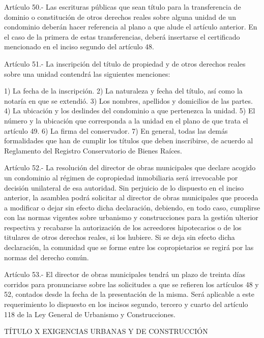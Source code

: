     Artículo 50.- Las escrituras públicas que sean título para la transferencia de dominio o constitución de otros derechos reales sobre alguna unidad de un condominio deberán hacer referencia al plano a que alude el artículo anterior. En el caso de la primera de estas transferencias, deberá insertarse el certificado mencionado en el inciso segundo del artículo 48.
     
    Artículo 51.- La inscripción del título de propiedad y de otros derechos reales sobre una unidad contendrá las siguientes menciones:
     
    1) La fecha de la inscripción.
    2) La naturaleza y fecha del título, así como la notaría en que se extendió.
    3) Los nombres, apellidos y domicilios de las partes.
    4) La ubicación y los deslindes del condominio a que pertenezca la unidad.
    5) El número y la ubicación que corresponda a la unidad en el plano de que trata el artículo 49.
    6) La firma del conservador.
    7) En general, todas las demás formalidades que han de cumplir los títulos que deben inscribirse, de acuerdo al Reglamento del Registro Conservatorio de Bienes Raíces.
     
    Artículo 52.- La resolución del director de obras municipales que declare acogido un condominio al régimen de copropiedad inmobiliaria será irrevocable por decisión unilateral de esa autoridad.
    Sin perjuicio de lo dispuesto en el inciso anterior, la asamblea podrá solicitar al director de obras municipales que proceda a modificar o dejar sin efecto dicha declaración, debiendo, en todo caso, cumplirse con las normas vigentes sobre urbanismo y construcciones para la gestión ulterior respectiva y recabarse la autorización de los acreedores hipotecarios o de los titulares de otros derechos reales, si los hubiere. Si se deja sin efecto dicha declaración, la comunidad que se forme entre los copropietarios se regirá por las normas del derecho común.
   
    Artículo 53.- El director de obras municipales tendrá un plazo de treinta días corridos para pronunciarse sobre las solicitudes a que se refieren los artículos 48 y 52, contados desde la fecha de la presentación de la misma. Será aplicable a este requerimiento lo dispuesto en los incisos segundo, tercero y cuarto del artículo 118 de la Ley General de Urbanismo y Construcciones.

    TÍTULO X
    EXIGENCIAS URBANAS Y DE CONSTRUCCIÓN


